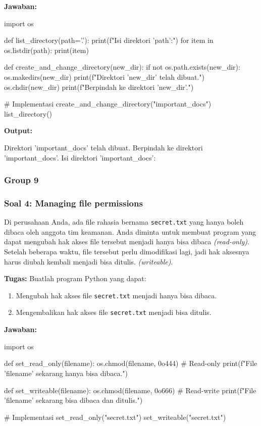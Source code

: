 \documentclass[12pt]{article}
\begin{document}
\textbf{Jawaban:}
\begin{python}
import os

def list_directory(path='.'):
    print(f"Isi direktori '{path}':")
    for item in os.listdir(path):
        print(item)

def create_and_change_directory(new_dir):
    if not os.path.exists(new_dir):
        os.makedirs(new_dir)
        print(f"Direktori '{new_dir}' telah dibuat.")
    os.chdir(new_dir)
    print(f"Berpindah ke direktori '{new_dir}'.")

# Implementasi
create_and_change_directory("important_docs")
list_directory()
\end{python}

\textbf{Output:}
\begin{python}
Direktori 'important_docs' telah dibuat.
Berpindah ke direktori 'important_docs'.
Isi direktori 'important_docs':
\end{python}

\subsubsection{Group 9}
\subsubsection*{Soal 4: Managing file permissions}
Di perusahaan Anda, ada file rahasia bernama \texttt{secret.txt} yang hanya boleh dibaca oleh anggota tim keamanan. Anda diminta untuk membuat program yang dapat mengubah hak akses file tersebut menjadi hanya bisa dibaca \textit{(read-only)}. Setelah beberapa waktu, file tersebut perlu dimodifikasi lagi, jadi hak aksesnya harus diubah kembali menjadi bisa ditulis. \textit{(writeable)}.

\textbf{Tugas:} Buatlah program Python yang dapat:
\begin{enumerate}
    \item Mengubah hak akses file \texttt{secret.txt} menjadi hanya bisa dibaca.
    \item Mengembalikan hak akses file \texttt{secret.txt} menjadi bisa ditulis.
\end{enumerate}

\textbf{Jawaban:}
\begin{python}
import os

def set_read_only(filename):
    os.chmod(filename, 0o444)  # Read-only
    print(f"File '{filename}' sekarang hanya bisa dibaca.")

def set_writeable(filename):
    os.chmod(filename, 0o666)  # Read-write
    print(f"File '{filename}' sekarang bisa dibaca dan ditulis.")

# Implementasi
set_read_only("secret.txt")
set_writeable("secret.txt")
\end{python}
\end{document}
